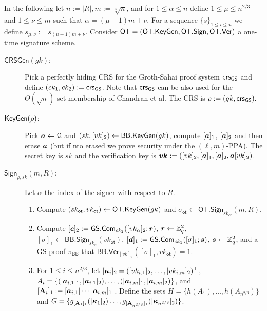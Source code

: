 
In the following let $n:=|R|, m:=\sqrt[3]{n}$, and for $1\leq \alpha\leq n$ define $1\leq \mu \leq n^{2/3}$ and $1\leq \nu\leq m$ such that $\alpha=(\mu-1)m+\nu$. For a sequence $\{s\}_{1\leq i\leq n}$ we define $s_{\mu,\nu}:=s_{(\mu-1)m+\nu}$. Consider $\mathsf{OT}=(\mathsf{OT}.\mathsf{KeyGen},\mathsf{OT}.\mathsf{Sign},\allowbreak\mathsf{OT}.\mathsf{Ver})$ a one-time signature scheme.

\begin{description}
\item[$\mathsf{CRSGen}(gk)$:] Pick a perfectly hiding CRS for the Groth-Sahai proof system $\mathsf{crs}_{\mathsf{GS}}$ and define $(ck_1,ck_2):=\mathsf{crs}_{\mathsf{GS}}$. Note that $\mathsf{crs}_{\mathsf{GS}}$ can be also used for the $\Theta(\sqrt{n})$ set-membership of Chandran et al. The CRS is $\rho:=(gk,\mathsf{crs}_{\mathsf{GS}}).$

\item[$\mathsf{KeyGen}(\rho)$:] Pick ${\boldsymbol{a}}\gets\mathcal{Q}$ and $(sk,[vk]_2)\gets\mathsf{BB}.\mathsf{KeyGen}(gk)$, compute $[{\boldsymbol{a}}]_1$, $[{\boldsymbol{a}}]_2$ and then erase ${\boldsymbol{a}}$ (but if nto erased we prove security under the $(\ell,m)$-PPA). The secret key is $sk$ and the verification key is ${\boldsymbol{vk}}:=([vk]_2,[{\boldsymbol{a}}]_1,[{\boldsymbol{a}}]_2,{\boldsymbol{a}}[vk]_2)$.

\item[$\mathsf{Sign}_{\rho,sk}(m,R)$:] Let $\alpha$ the index of the signer with respect to $R$.
\begin{enumerate}
\item Compute $(sk_\mathsf{ot},vk_\mathsf{ot})\gets\mathsf{OT}.\mathsf{KeyGen}(gk)$ and $\sigma_\mathsf{ot}\gets\allowbreak\mathsf{OT}.\allowbreak\mathsf{Sign}_{sk_\mathsf{ot}}(m,R)$.

\item Compute $[{\boldsymbol{c}}]_2:={\mathsf{GS}}.\mathsf{Com}_{ck_2}([vk_\alpha]_2;{\boldsymbol{r}})$, ${\boldsymbol{r}}\gets\mathbb{Z}_q^2$, $[\sigma]_1\gets\mathsf{BB}.\mathsf{Sign}_{sk_\alpha}(vk_\mathsf{ot})$, $[{\boldsymbol{d}}]_1:={\mathsf{GS}}.\mathsf{Com}_{ck_1}([\sigma]_1;{\boldsymbol{s}})$, ${\boldsymbol{s}}\gets\mathbb{Z}_q^2$, and a GS proof $\pi_\mathsf{BB}$ that $\mathsf{BB}.\mathsf{Ver}_{[vk]_2}(\allowbreak[\sigma]_1,vk_\mathsf{ot})=1$.

\item For $1\leq i \leq n^{2/3}$, let $[{\boldsymbol{\kappa}}_i]_2=([vk_{i,1}]_2,\ldots,[vk_{i,m}]_2)^\top$, $A_i=\{([{\boldsymbol{a}}_{i,1}]_1,[{\boldsymbol{a}}_{i,1}]_2),\allowbreak\ldots,\allowbreak([{\boldsymbol{a}}_{i,m}]_1,[{\boldsymbol{a}}_{i,m}]_2)\}$, and $[\mathbf{{A}}_i]_1:=[{\boldsymbol{a}}_{i,1}|\cdots|{\boldsymbol{a}}_{i,m}]_1$ . Define the sets
$H=\{h(A_1),\allowbreak\ldots,\allowbreak h(A_{n^{2/3}})\}$ and
$G=\{
	g_{[\mathbf{{A}}_1]_1}([{\boldsymbol{\kappa}}_1]_2)
	\allowbreak\ldots,\allowbreak
	g_{[\mathbf{{A}}_{n^{2/3}}]_1}([{\boldsymbol{\kappa}}_{n^{2/3}}]_2)\}$.


\end{enumerate}
\end{description}
